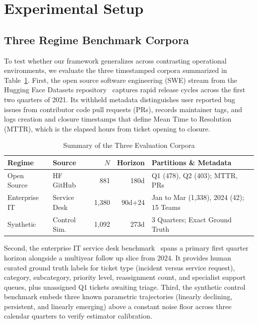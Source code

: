 \documentclass[sigconf,anonymous,pbalance]{acmart}
\begin{document}
\section{Experimental Setup}

\subsection{Three Regime Benchmark Corpora}
To test whether our framework generalizes across contrasting operational environments, we evaluate the three timestamped corpora summarized in Table~\ref{tab:corpora}. First, the open source software engineering (SWE) stream from the Hugging Face Datasets repository~\cite{lhoest2021datasets} captures rapid release cycles across the first two quarters of 2021. Its withheld metadata distinguishes user reported bug issues from contributor code pull requests (PRs), records maintainer tags, and logs creation and closure timestamps that define Mean Time to Resolution (MTTR), which is the elapsed hours from ticket opening to closure.

\begin{table}[!htbp]
  \caption{Summary of the Three Evaluation Corpora}
  \label{tab:corpora}
  \footnotesize
  \setlength{\tabcolsep}{2.2pt}
  \begin{tabular}{llrrl}
    \toprule
    Regime & Source & $N$ & Horizon & Partitions \& Metadata \\
    \midrule
    Open Source & HF GitHub & 881 & 180d & Q1 (478), Q2 (403); MTTR, PRs \\
    Enterprise IT & Service Desk & 1,380 & 90d+24 & Jan to Mar (1,338), 2024 (42); 15 Teams \\
    Synthetic & Control Sim. & 1,092 & 273d & 3 Quarters; Exact Ground Truth \\
    \bottomrule
  \end{tabular}
\end{table}

Second, the enterprise IT service desk benchmark~\cite{vogel2024itsm} spans a primary first quarter horizon alongside a multiyear follow up slice from 2024. It provides human curated ground truth labels for ticket type (incident versus service request), category, subcategory, priority level, reassignment count, and specialist support queues, plus unassigned Q1 tickets awaiting triage. Third, the synthetic control benchmark embeds three known parametric trajectories (linearly declining, persistent, and linearly emerging) above a constant noise floor across three calendar quarters to verify estimator calibration.
\end{document}
